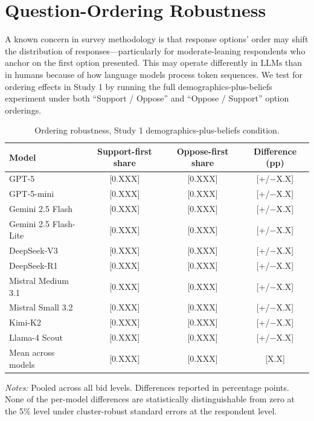 \documentclass[12pt]{article}
\begin{document}
\section{Question-Ordering Robustness}\label{app:order-bias}

A known concern in survey methodology is that response options' order may shift the distribution of responses---particularly for moderate-leaning respondents who anchor on the first option presented. This may operate differently in LLMs than in humans because of how language models process token sequences. We test for ordering effects in Study 1 by running the full demographics-plus-beliefs experiment under both ``Support / Oppose'' and ``Oppose / Support'' option orderings.

\begin{table}[h]
    \centering
    \caption{Ordering robustness, Study 1 demographics-plus-beliefs condition.}
    \label{tab:order-bias}
    \begin{threeparttable}
    \begin{tabular}{lccc}
        \toprule
        Model & Support-first share & Oppose-first share & Difference (pp) \\
        \midrule
        GPT-5                  & [0.XXX] & [0.XXX] & [+/$-$X.X] \\
        GPT-5-mini             & [0.XXX] & [0.XXX] & [+/$-$X.X] \\
        Gemini 2.5 Flash       & [0.XXX] & [0.XXX] & [+/$-$X.X] \\
        Gemini 2.5 Flash-Lite  & [0.XXX] & [0.XXX] & [+/$-$X.X] \\
        DeepSeek-V3            & [0.XXX] & [0.XXX] & [+/$-$X.X] \\
        DeepSeek-R1            & [0.XXX] & [0.XXX] & [+/$-$X.X] \\
        Mistral Medium 3.1     & [0.XXX] & [0.XXX] & [+/$-$X.X] \\
        Mistral Small 3.2      & [0.XXX] & [0.XXX] & [+/$-$X.X] \\
        Kimi-K2                & [0.XXX] & [0.XXX] & [+/$-$X.X] \\
        Llama-4 Scout          & [0.XXX] & [0.XXX] & [+/$-$X.X] \\
        \midrule
        Mean across models     & [0.XXX] & [0.XXX] & [X.X]      \\
        \bottomrule
    \end{tabular}
    \begin{tablenotes}\footnotesize
        \item \textit{Notes:} Pooled across all bid levels. Differences reported in percentage points. None of the per-model differences are statistically distinguishable from zero at the 5\% level under cluster-robust standard errors at the respondent level.
    \end{tablenotes}
    \end{threeparttable}
\end{table}
\end{document}
